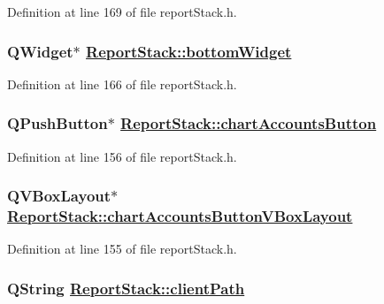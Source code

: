 Definition at line 169 of file report\-Stack.h.\hypertarget{classReportStack_r86}{
\subsubsection[bottomWidget]{\setlength{\rightskip}{0pt plus 5cm}QWidget$\ast$ \hyperlink{classReportStack_r86}{Report\-Stack::bottom\-Widget}}}
\label{classReportStack_r86}


Definition at line 166 of file report\-Stack.h.\hypertarget{classReportStack_r78}{
\subsubsection[chartAccountsButton]{\setlength{\rightskip}{0pt plus 5cm}QPush\-Button$\ast$ \hyperlink{classReportStack_r78}{Report\-Stack::chart\-Accounts\-Button}}}
\label{classReportStack_r78}


Definition at line 156 of file report\-Stack.h.\hypertarget{classReportStack_r77}{
\subsubsection[chartAccountsButtonVBoxLayout]{\setlength{\rightskip}{0pt plus 5cm}QVBox\-Layout$\ast$ \hyperlink{classReportStack_r77}{Report\-Stack::chart\-Accounts\-Button\-VBox\-Layout}}}
\label{classReportStack_r77}


Definition at line 155 of file report\-Stack.h.\hypertarget{classReportStack_r3}{
\subsubsection[clientPath]{\setlength{\rightskip}{0pt plus 5cm}QString \hyperlink{classReportStack_r3}{Report\-Stack::client\-Path}}}
\label{classReportStack_r3}



